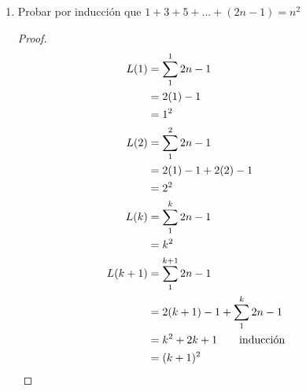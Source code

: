 \documentclass[a4paper,10pt]{article}
\begin{document}
\begin{enumerate}
  \item Probar por inducción que $1+3+5+...+(2n-1)=n^2$
  \begin{proof}
   \begin{align*}
    L(1) &= \sum_{1}^{1} 2n - 1
    \\ &= 2(1) - 1
    \\ &= 1^2
    \\ L(2) &= \sum_{1}^{2} 2n - 1
    \\ &= 2(1) - 1 + 2(2) - 1
    \\ &= 2^2
    \\ L(k) &= \sum_{1}^{k} 2n - 1
    \\ &= k^2
    \\ L(k+1) &= \sum_{1}^{k + 1} 2n - 1
    \\ &= 2(k + 1) - 1 + \sum_{1}^{k} 2n - 1
    \\ &= k^2 + 2k + 1 \tag*{inducción}
    \\ &= (k + 1)^2 &&\qedhere
   \end{align*}

  \end{proof}


\end{enumerate}
\end{document}
